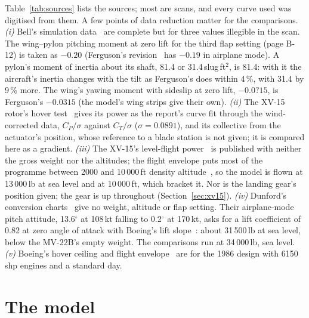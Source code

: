 \documentclass[10pt,a4paper,twocolumn]{article}
\begin{document}
Table~\ref{tab:sources} lists the sources; most are scans, and every curve used was digitised from them. A few points of data
reduction matter for the comparisons.
\emph{(i)} Bell's simulation data~\cite{cr} are complete but for three values illegible in the scan. The wing--pylon pitching moment at zero lift for the
third flap setting (page B-12) is taken as $-0.20$ (Ferguson's revision~\cite{gt} has $-0.19$ in airplane mode). A pylon's moment of inertia about its
shaft, 81.4 or 31.4\,slug\,ft$^2$, is 81.4: with it the aircraft's inertia changes with the tilt as Ferguson's does within 4\,\%, with 31.4 by 9\,\% more.
The wing's yawing moment with sideslip at zero lift, $-0.0?15$, is Ferguson's $-0.0315$ (the model's wing strips give their own).
\emph{(ii)} The XV-15 rotor's hover test~\cite{fb} gives its power as the report's curve fit through the wind-corrected data,
$C_P/\sigma$ against $C_T/\sigma$ ($\sigma=0.0891$), and its collective from the actuator's position, whose reference to a blade
station is not given; it is compared here as a gradient.
\emph{(iii)} The XV-15's level-flight power~\cite{cd} is published with neither the gross weight nor the altitudes; the flight
envelope puts most of the programme between 2000 and 10\,000\,ft density altitude~\cite{ma}, so the model is flown at 13\,000\,lb at sea
level and at 10\,000\,ft, which bracket it. Nor is the landing gear's position given; the gear is up throughout (Section~\ref{sec:xv15}).
\emph{(iv)} Dunford's conversion charts~\cite{pd} give no weight, altitude or flap setting. Their airplane-mode pitch attitude, 13.6$^\circ$
at 108\,kt falling to 0.2$^\circ$ at 170\,kt, asks for a lift coefficient of 0.82 at zero angle of attack with Boeing's lift slope~\cite{rc}:
about 31\,500\,lb at sea level, below the MV-22B's empty weight. The comparisons run at 34\,000\,lb, sea level.
\emph{(v)} Boeing's hover ceiling and flight envelope~\cite{rc} are for the 1986 design with 6150\,shp engines and a standard day.

\section{The model}\label{sec:model}
\end{document}
